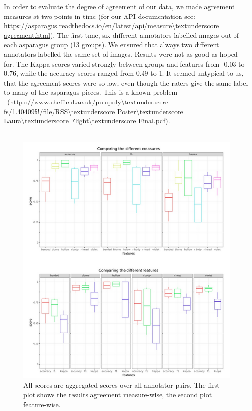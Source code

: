 In order to evaluate the degree of agreement of our data, we made agreement measures at two points in time (for our API documentation see: \url{https://asparagus.readthedocs.io/en/latest/api/measure\textunderscore agreement.html}). The first time, six different annotators labelled images out of each asparagus group (13 groups). We ensured that always two different annotators labelled the same set of images. Results were not as good as hoped for. The Kappa scores varied strongly between groups and features from -0.03 to 0.76, while the accuracy scores ranged from 0.49 to 1. It seemed untypical to us, that the agreement scores were so low, even though the raters give the same label to many of the asparagus pieces. This is a known problem~\citep{powers2012problem} ~\citep{sim2005kappa} ~\citep{feinstein1990high}(\url{https://www.sheffield.ac.uk/polopoly\textunderscore fs/1.404095!/file/RSS\textunderscore Poster\textunderscore Laura\textunderscore Flight\textunderscore Final.pdf}). \\
\\
\begin{figure}[h]
	\centering
	\includegraphics[scale=0.6]{Figures/chapter03/kappacompare}
	\decoRule
	\caption[Comparing the different features]{All scores are aggregated scores over all annotator pairs. The first plot shows the results agreement measure-wise, the second plot feature-wise.}
	\label{fig:KappaCompare}
\end{figure}

